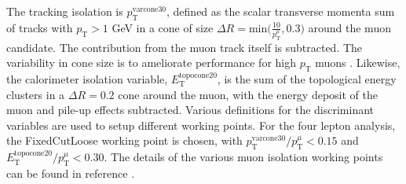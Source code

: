 The tracking isolation is $p_{\text{T}}^{\text{varcone30}}$, defined as the scalar transverse momenta sum of tracks with $p_{\text{T}}>1$ GeV in a cone of size $\Delta R=\text{min}\Big(\frac{10}{p_{\text{T}}^{\mu}},0.3\Big)$ around the muon candidate. The contribution from the muon track itself is subtracted. The variability in cone size is to ameliorate performance for high $p_{\text{T}}$ muons \cite{ATLAS_muon_reco_2016}. Likewise, the calorimeter isolation variable, $E_{\text{T}}^{\text{topocone20}}$, is the sum of the topological energy clusters in a $\Delta R=0.2$ cone around the muon, with the energy deposit of the muon and pile-up effects subtracted. Various definitions for the discriminant variables are used to setup different working points. For the four lepton analysis, the FixedCutLoose working point is chosen, with $p_{\text{T}}^{\text{varcone30}}/p_{\text{T}}^{\mu}<0.15$ and $E_{\text{T}}^{\text{topocone20}}/p_{\text{T}}^{\mu}<0.30$. The details of the various muon isolation working points can be found in reference \cite{ATLAS_muon_reco_2016}.


